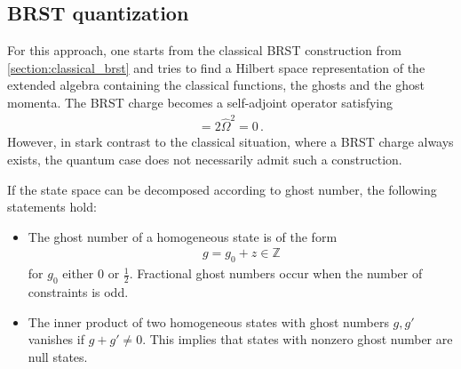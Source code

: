 
\subsection{BRST quantization}

    For this approach, one starts from the classical BRST construction from \cref{section:classical_brst} and tries to find a Hilbert space representation of the extended algebra containing the classical functions, the ghosts and the ghost momenta. The BRST charge becomes a self-adjoint operator satisfying
    \begin{gather}
        [\widehat{\Omega},\widehat{\Omega}] = 2\widehat{\Omega}^2 = 0\,.
    \end{gather}
    However, in stark contrast to the classical situation, where a BRST charge always exists, the quantum case does not necessarily admit such a construction.

    \begin{property}
        If the state space can be decomposed according to ghost number, the following statements hold:
        \begin{itemize}
            \item The ghost number of a homogeneous state is of the form
                \begin{gather}
                    g = g_0 + z\in\mathbb{Z}
                \end{gather}
                for $g_0$ either $0$ or $\frac{1}{2}$. Fractional ghost numbers occur when the number of constraints is odd.
            \item The inner product of two homogeneous states with ghost numbers $g,g'$ vanishes if $g+g'\neq0$. This implies that states with nonzero ghost number are null states.
        \end{itemize}
    \end{property}


